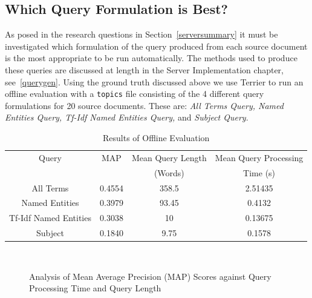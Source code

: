 \documentclass{l4proj}
\newcommand{\code}[1]{\texttt{#1}}
\begin{document}
\subsection{Which Query Formulation is Best?} \label{whichquery}
As posed in the research questions in Section~\ref{serversummary} it must be investigated which formulation of the query produced from each source document is the most appropriate to be run automatically. The methods used to produce these queries are discussed at length in the Server Implementation chapter, see~\ref{querygen}.
Using the ground truth discussed above we use Terrier to run an offline evaluation with a \code{topics} file consisting of the 4 different query formulations for 20 source documents. These are: \textit{All Terms Query, Named Entities Query, Tf-Idf Named Entities Query,} and \textit{Subject Query}.
\begin{center}
\begin{table}[h]
\centering
\begin{tabular}{|c|c|c|c|}
\hline
Query                 & MAP    & Mean Query Length & Mean Query Processing \\ 
& & (Words) & Time (s) \\\hline
All Terms             & 0.4554 & 358.5             & 2.51435                        \\ \hline
Named Entities        & 0.3979 & 93.45             & 0.4132                         \\ \hline
Tf-Idf Named Entities & 0.3038 & 10                & 0.13675                       \\ \hline
Subject               & 0.1840 & 9.75              & 0.1578                        \\ \hline
\end{tabular}
\caption{Results of Offline Evaluation}
\label{standard_results}
\end{table}
\end{center}

\begin{figure}[H]
\centering
\begin{subfigure}[t]{.5\textwidth}
\centering
{}
\end{subfigure}%
~
\begin{subfigure}[t]{.5\textwidth}
\centering
{}
\end{subfigure}
\caption{Analysis of Mean Average Precision (MAP) Scores against Query Processing Time and Query Length} \label{mapgraphs}
\end{figure}
\end{document}
